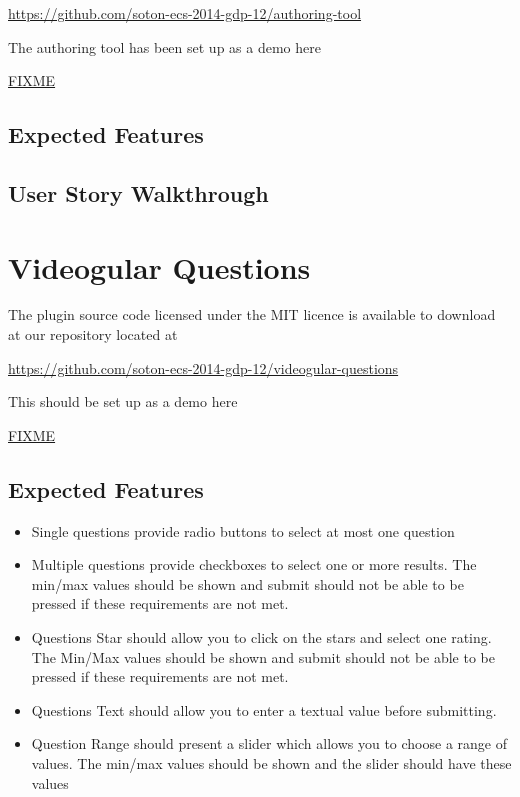 \documentclass[12pt,a4paper]{article}
\begin{document}
\url{https://github.com/soton-ecs-2014-gdp-12/authoring-tool}

The authoring tool has been set up as a demo here

\url{FIXME}

\subsection{Expected Features}



\subsection{User Story Walkthrough}

\section{Videogular Questions}

The plugin source code licensed under the MIT licence is available to download at our repository located at 

\url{https://github.com/soton-ecs-2014-gdp-12/videogular-questions}

This should be set up as a demo here

\url{FIXME}

\subsection{Expected Features}

\begin{itemize}
\item Single questions provide radio buttons to select at most one question
\item Multiple questions provide checkboxes to select one or more results. The min/max values should be shown and submit should not be able to be pressed if these requirements are not met.
\item Questions Star should allow you to click on the stars and select one rating. The Min/Max values should be shown and submit should not be able to be pressed if these requirements are not met.
\item Questions Text should allow you to enter a textual value before submitting.
\item Question Range should present a slider which allows you to choose a range of values. The min/max values should be shown and the slider should have these values
\end{itemize}
\end{document}
